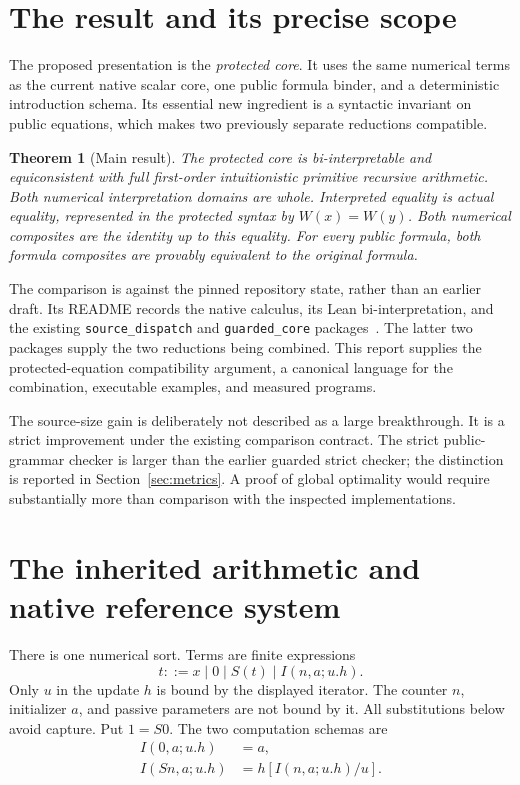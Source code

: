 \documentclass[11pt,letterpaper]{article}
\newtheorem{theorem}{Theorem}[section]
\theoremstyle{definition}\newtheorem{definition}[theorem]{Definition}
\theoremstyle{remark}\newtheorem{remark}[theorem]{Remark}
\newcommand{\file}[1]{{\urlstyle{tt}\nolinkurl{#1}}}
\begin{document}
\section{The result and its precise scope}

The proposed presentation is the \emph{protected core}. It uses the
same numerical terms as the current native scalar core, one public
formula binder, and a deterministic introduction schema. Its essential
new ingredient is a syntactic invariant on public equations, which
makes two previously separate reductions compatible.

\begin{theorem}[Main result]\label{thm:main}
The protected core is bi-interpretable and equiconsistent with full
first-order intuitionistic primitive recursive arithmetic. Both
numerical interpretation domains are whole. Interpreted equality is
actual equality, represented in the protected syntax by
\(W(x)=W(y)\). Both numerical composites are the identity up to this
equality. For every public formula, both formula composites are
provably equivalent to the original formula.
\end{theorem}

The comparison is against the pinned repository state, rather than an
earlier draft. Its README records the native calculus, its Lean
bi-interpretation, and the existing \file{source_dispatch} and
\file{guarded_core} packages~\cite{repo,source,guarded}. The latter two
packages supply the two reductions being combined. This report supplies
the protected-equation compatibility argument, a canonical language for
the combination, executable examples, and measured programs.

The source-size gain is deliberately not described as a large
breakthrough. It is a strict improvement under the existing comparison
contract. The strict public-grammar checker is larger than the earlier
guarded strict checker; the distinction is reported in
Section~\ref{sec:metrics}. A proof of global optimality would require
substantially more than comparison with the inspected implementations.

\section{The inherited arithmetic and native reference system}

There is one numerical sort. Terms are finite expressions
\[
 t ::= x\mid 0\mid S(t)\mid I(n,a;u.h).
\]
Only \(u\) in the update \(h\) is bound by the displayed iterator.
The counter \(n\), initializer \(a\), and passive parameters are not
bound by it. All substitutions below avoid capture. Put \(1=S0\).
The two computation schemas are
\begin{align}
 I(0,a;u.h)&=a,\tag{I0}\label{eq:i0}\\
 I(Sn,a;u.h)&=h[I(n,a;u.h)/u].\tag{IS}\label{eq:is}
\end{align}
\end{document}
